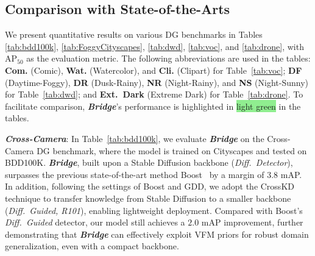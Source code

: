 







\subsection{Comparison with State-of-the-Arts}
We present quantitative results on various DG benchmarks in Tables \ref{tab:bdd100k}, \ref{tab:FoggyCityscapes}, \ref{tab:dwd}, \ref{tab:voc}, and \ref{tab:drone}, with AP$_{50}$ as the evaluation metric. 
The following abbreviations are used in the tables: 
\textbf{Com.} (Comic), \textbf{Wat.} (Watercolor), and \textbf{Cli.} (Clipart) for Table~\ref{tab:voc};
\textbf{DF} (Daytime-Foggy), \textbf{DR} (Dusk-Rainy), \textbf{NR} (Night-Rainy), and \textbf{NS} (Night-Sunny) for Table~\ref{tab:dwd};
and \textbf{Ext.~Dark} (Extreme Dark) for Table~\ref{tab:drone}.
To facilitate comparison, \textbf{\textit{Bridge}}’s performance is highlighted in \colorbox{lightgreen}{light green} in the tables.


\noindent\textbf{\textit{Cross-Camera}}:
In Table~\ref{tab:bdd100k}, we evaluate \textbf{\textit{Bridge}} on the Cross-Camera DG benchmark, where the model is trained on Cityscapes and tested on BDD100K.  
\textbf{\textit{Bridge}}, built upon a Stable Diffusion backbone (\textit{Diff.~Detector}), surpasses the previous state-of-the-art method Boost~\cite{he2025boosting} by a margin of $\mathbf{3.8}$ mAP. In addition, following the settings of Boost and GDD, we adopt the CrossKD~\cite{wang2024crosskd} technique to transfer knowledge from Stable Diffusion to a smaller backbone (\textit{Diff.~Guided, R101}), enabling lightweight deployment.  
Compared with Boost’s \textit{Diff.~Guided} detector, our model still achieves a $\mathbf{2.0}$ mAP improvement, further demonstrating that \textbf{\textit{Bridge}} can effectively exploit VFM priors for robust domain generalization, even with a compact backbone.


